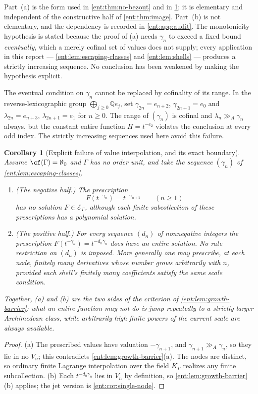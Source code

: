 \documentclass[11pt]{article}
\theoremstyle{plain}
\theoremstyle{plain}
\theoremstyle{plain}
\newtheorem{corollary}[corollary]{Corollary}
\theoremstyle{definition}
\theoremstyle{definition}
\theoremstyle{definition}
\theoremstyle{definition}
\theoremstyle{remark}
\newcommand{\Q}{\mathbb Q}\newcommand{\Z}{\mathbb Z}\newcommand{\N}{\mathbb N}
\newcommand{\K}{K_\Gamma}\newcommand{\KD}{K_\Delta}
\newcommand{\E}{\mathcal E_\Gamma}
\newcommand{\ggA}{\mathrel{\gg_{\!A}}}
\begin{document}
Part~(a) is the form used in \cref{ent:thm:no-bezout} and in
\cref{ent:cor:no-interpolation}; it is elementary and independent of the
constructive half of \cref{ent:thm:image}. Part~(b) is not elementary, and
the dependency is recorded in \cref{ent:app:audit}. The monotonicity
hypothesis is stated because the proof of (a) needs $\gamma_n$ to exceed a
fixed bound \emph{eventually}, which a merely cofinal set of values does not
supply; every application in this report --- \cref{ent:lem:escaping-classes}
and \cref{ent:lem:shells} --- produces a strictly increasing sequence. No
conclusion has been weakened by making the hypothesis explicit.

The eventual condition on $\gamma_n$ cannot be replaced by cofinality of
its range. In the reverse-lexicographic group
$\bigoplus_{j\ge0}\Q e_j$, set
$\gamma_{2n}=e_{n+2}$, $\gamma_{2n+1}=e_0$ and
$\lambda_{2n}=e_{n+3}$, $\lambda_{2n+1}=e_1$ for $n\ge0$.
The range of $(\gamma_n)$ is cofinal and $\lambda_n\ggA\gamma_n$ always,
but the constant entire function $H=t^{-e_2}$ violates the conclusion at
every odd index. The strictly increasing sequences used here avoid this failure.


\begin{corollary}[Explicit failure of value interpolation, and its exact
boundary]
\label{ent:cor:no-interpolation}
Assume $\cf(\Gamma)=\aleph_0$ and $\Gamma$ has no order unit, and take the
sequence $(\gamma_n)$ of \cref{ent:lem:escaping-classes}.
\begin{enumerate}[label=\textnormal{(\alph*)},leftmargin=2em]
\item \emph{(The negative half.)} The prescription
\[
 F(t^{-\gamma_n})=t^{-\gamma_{n+1}}\qquad(n\ge1)
\]
has no solution $F\in\E$, although each finite subcollection of these
prescriptions has a polynomial solution.
\item \emph{(The positive half.)} For \emph{every} sequence $(d_n)$ of
nonnegative integers the prescription $F(t^{-\gamma_n})=t^{-d_n\gamma_n}$
does have an entire solution. No rate restriction on $(d_n)$ is imposed. More
generally one may prescribe, at each node, finitely many derivatives whose
number grows arbitrarily with $n$, provided each shell's finitely many
coefficients satisfy the same scale condition.
\end{enumerate}
Together, (a) and (b) are the two sides of the criterion of
\cref{ent:lem:growth-barrier}: what an entire function may not do is jump
repeatedly to a strictly larger Archimedean class, while arbitrarily high
\emph{finite} powers of the current scale are always available.
\end{corollary}
\begin{proof}
(a) The prescribed values have valuation $-\gamma_{n+1}$, and
$\gamma_{n+1}\ggA\gamma_n$, so they lie in no $V_n$; this contradicts
\cref{ent:lem:growth-barrier}(a). The nodes are distinct, so ordinary finite
Lagrange interpolation over the field $\K$ realizes any finite subcollection.
(b) Each $t^{-d_n\gamma_n}$ lies in $V_n$ by definition, so
\cref{ent:lem:growth-barrier}(b) applies; the jet version is
\cref{ent:cor:single-node}.
\end{proof}
\end{document}
